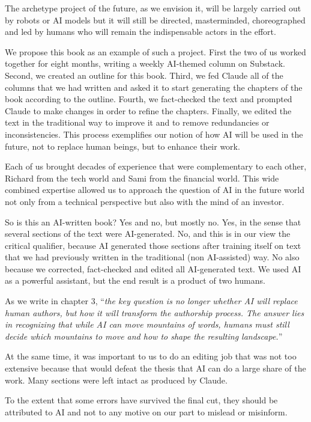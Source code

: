 \documentclass[
  Letterpaper,
]{scrbook}
\begin{document}
The archetype project of the future, as we envision it, will be largely
carried out by robots or AI models but it will still be directed,
masterminded, choreographed and led by humans who will remain the
indispensable actors in the effort.

We propose this book as an example of such a project. First the two of
us worked together for eight months, writing a weekly AI-themed column
on Substack. Second, we created an outline for this book. Third, we fed
Claude all of the columns that we had written and asked it to start
generating the chapters of the book according to the outline. Fourth, we
fact-checked the text and prompted Claude to make changes in order to
refine the chapters. Finally, we edited the text in the traditional way
to improve it and to remove redundancies or inconsistencies. This
process exemplifies our notion of how AI will be used in the future, not
to replace human beings, but to enhance their work.

Each of us brought decades of experience that were complementary to each
other, Richard from the tech world and Sami from the financial world.
This wide combined expertise allowed us to approach the question of AI
in the future world not only from a technical perspective but also with
the mind of an investor.

So is this an AI-written book? Yes and no, but mostly no. Yes, in the
sense that several sections of the text were AI-generated. No, and this
is in our view the critical qualifier, because AI generated those
sections after training itself on text that we had previously written in
the traditional (non AI-assisted) way. No also because we corrected,
fact-checked and edited all AI-generated text. We used AI as a powerful
assistant, but the end result is a product of two humans.

As we write in chapter 3, ``\emph{the key question is no longer whether
AI will replace human authors, but how it will transform the authorship
process. The answer lies in recognizing that while AI can move mountains
of words, humans must still decide which mountains to move and how to
shape the resulting landscape.}''

At the same time, it was important to us to do an editing job that was
not too extensive because that would defeat the thesis that AI can do a
large share of the work. Many sections were left intact as produced by
Claude.

To the extent that some errors have survived the final cut, they should
be attributed to AI and not to any motive on our part to mislead or
misinform.
\end{document}
